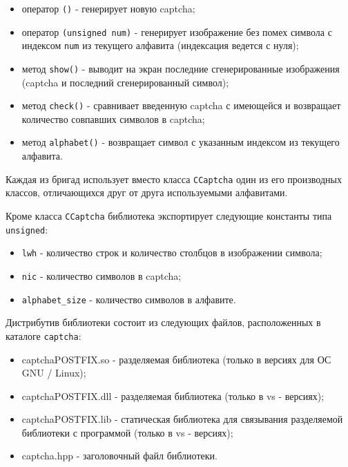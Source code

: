 \begin{itemize}

	\item оператор \verb|()| - генерирует новую captcha;
	\item оператор \verb|(unsigned num)| - генерирует изображение без помех символа с индексом \verb|num| из текущего алфавита (индексация ведется с нуля);
	\item метод \verb|show()| - выводит на экран последние сгенерированные изображения (captcha и последний сгенерированный символ);
	\item метод \verb|check()| - сравнивает введенную captcha с имеющейся и возвращает количество совпавших символов в captcha;
	\item метод \verb|alphabet()| - возвращает символ с указанным индексом из текущего алфавита.

\end{itemize}

Каждая из бригад использует вместо класса \verb|CCaptcha| один из его производных классов, отличающихся друг от друга используемыми алфавитами.

Кроме класса \verb|CCaptcha| библиотека экспортирует следующие константы типа \verb|unsigned|:

\begin{itemize}

	\item \verb|lwh| - количество строк и количество столбцов в изображении символа;
	\item \verb|nic| - количество символов в captcha;
	\item \verb|alphabet_size| - количество символов в алфавите.

\end{itemize}

Дистрибутив библиотеки состоит из следующих файлов, расположенных в каталоге \verb|captcha|:

\begin{itemize}

	\item captchaPOSTFIX.so - разделяемая библиотека (только в версиях для ОС GNU / Linux);
	\item captchaPOSTFIX.dll - разделяемая библиотека (только в vs - версиях);
	\item captchaPOSTFIX.lib - статическая библиотека для связывания разделяемой библиотеки с программой (только в vs - версиях);
	\item captcha.hpp - заголовочный файл библиотеки.

\end{itemize}


